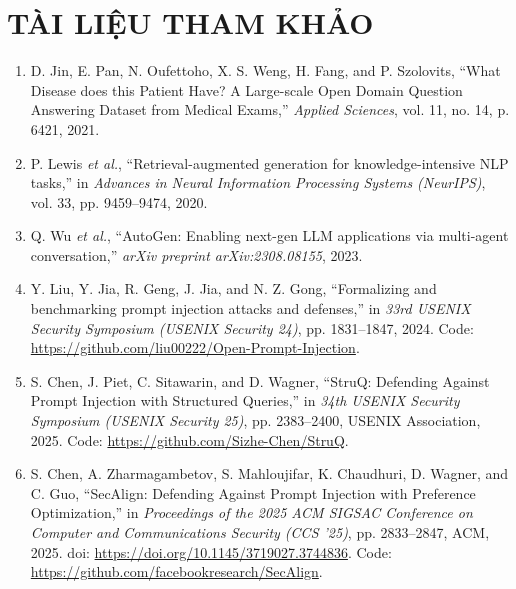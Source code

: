 \section*{TÀI LIỆU THAM KHẢO}
\begin{enumerate}
    \item D. Jin, E. Pan, N. Oufettoho, X. S. Weng, H. Fang, and P. Szolovits,
    ``What Disease does this Patient Have? A Large-scale Open Domain
    Question Answering Dataset from Medical Exams,'' \textit{Applied
    Sciences}, vol. 11, no. 14, p. 6421, 2021.

    \item P. Lewis \textit{et al.}, ``Retrieval-augmented generation for
    knowledge-intensive NLP tasks,'' in \textit{Advances in Neural
    Information Processing Systems (NeurIPS)}, vol. 33, pp. 9459--9474,
    2020.

    \item Q. Wu \textit{et al.}, ``AutoGen: Enabling next-gen LLM
    applications via multi-agent conversation,'' \textit{arXiv preprint
    arXiv:2308.08155}, 2023.

    \item Y. Liu, Y. Jia, R. Geng, J. Jia, and N. Z. Gong, ``Formalizing
    and benchmarking prompt injection attacks and defenses,'' in
    \textit{33rd USENIX Security Symposium (USENIX Security 24)},
    pp. 1831--1847, 2024. Code:
    \url{https://github.com/liu00222/Open-Prompt-Injection}.

    \item S. Chen, J. Piet, C. Sitawarin, and D. Wagner, ``StruQ:
    Defending Against Prompt Injection with Structured Queries,'' in
    \textit{34th USENIX Security Symposium (USENIX Security 25)},
    pp. 2383--2400, USENIX Association, 2025. Code:
    \url{https://github.com/Sizhe-Chen/StruQ}.

    \item S. Chen, A. Zharmagambetov, S. Mahloujifar, K. Chaudhuri,
    D. Wagner, and C. Guo, ``SecAlign: Defending Against Prompt
    Injection with Preference Optimization,'' in \textit{Proceedings of
    the 2025 ACM SIGSAC Conference on Computer and Communications
    Security (CCS '25)}, pp. 2833--2847, ACM, 2025.
    doi: \url{https://doi.org/10.1145/3719027.3744836}. Code:
    \url{https://github.com/facebookresearch/SecAlign}.
\end{enumerate}
